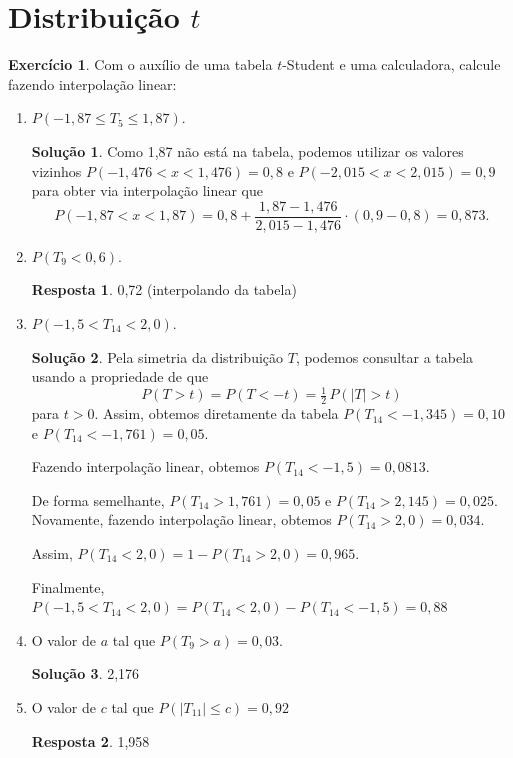 \documentclass[12pt,a4paper]{article}
\theoremstyle{definition}
\newtheorem{exercise}{Exercício}
\newtheorem*{solution}{Solução}
\newtheorem*{answer}{Resposta}
\begin{document}
\clearpage
\section{Distribuição $t$}

\begin{exercise}
Com o auxílio de uma tabela $t$-Student e uma calculadora, calcule fazendo interpolação linear:
\begin{enumerate}
\item $P(-1,87 \leq T_{5} \leq 1,87)$.
\begin{solution}
Como 1,87 não está na tabela, podemos utilizar os valores vizinhos  $P(-1,476 < x < 1,476 ) = 0,8$ e $P(-2,015 < x < 2,015) = 0,9$ para obter via interpolação linear que
\[
P(-1,87 < x < 1,87)
=
0,8 + \frac{1,87-1,476}{2,015-1,476} \cdot (0,9-0,8)
=
0,873
.
\]
\end{solution}
\item $P( T_{9} < 0,6 )$.
\begin{answer}
0,72
(interpolando da tabela)
\end{answer}
\item $P(-1,5 < T_{14} < 2,0)$.
\begin{solution}
Pela simetria da distribuição $T$, podemos consultar a tabela usando a propriedade de que
\[
P(T>t) = P(T<-t) = \tfrac{1}{2} \, P( |T| > t)
\]
para $t>0$.
Assim, obtemos diretamente da tabela
$P(T_{14}<-1,345)=0,10$ e $P(T_{14}<-1,761)=0,05$.

Fazendo interpolação linear, obtemos
$P(T_{14}<-1,5) = 0,0813$.

De forma semelhante,
$P(T_{14}>1,761)=0,05$ e $P(T_{14}>2,145)=0,025$.
Novamente, fazendo interpolação linear, obtemos
$P(T_{14}>2,0) = 0,034$.

Assim,
$P(T_{14}<2,0) = 1 - P(T_{14}>2,0) = 0,965$.

Finalmente,
$P(-1,5 < T_{14} < 2,0) = P(T_{14}<2,0) - P(T_{14}<-1,5) = 0,88$
\end{solution}
\item O valor de $a$ tal que $P(T_{9} > a) = 0,03$.
\begin{solution}
2,176
\end{solution}
\item O valor de $c$ tal que $P(|T_{11}| \leq c) = 0,92$
\begin{answer}
1,958
\end{answer}
\end{enumerate}
\end{exercise}
\end{document}
